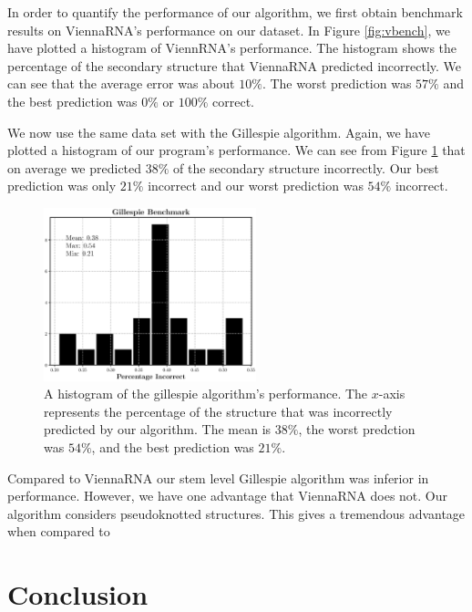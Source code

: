 \documentclass[11pt]{article}
\begin{document}
\begin{multicols}{2}
In order to quantify the performance of our algorithm, we first obtain benchmark results on ViennaRNA's performance on our dataset. In Figure \ref{fig:vbench}, we have plotted a histogram of ViennRNA's performance. The histogram shows the percentage of the secondary structure that ViennaRNA predicted incorrectly. We can see that the average error was about $10\%$. The worst prediction was $57\%$ and the best prediction was $0\%$ or $100\%$ correct.

We now use the same data set with the Gillespie algorithm. Again, we have plotted a histogram of our program's performance. We can see from Figure \ref{fig:gill} that on average we predicted $38\%$ of the secondary structure incorrectly. Our best prediction was only $21\%$ incorrect and our worst prediction was $54\%$ incorrect.

\begin{figure}[H]
\centering
\includegraphics[width = 0.55\textwidth]{fig/gill_bench}
\caption{A histogram of the gillespie algorithm's performance. The $x$-axis represents the percentage of the structure that was incorrectly predicted by our algorithm. The mean is $38 \%$, the worst predction  was $54\%$, and the best prediction was $21 \%$.}
\label{fig:gill}
\end{figure}

Compared to ViennaRNA our stem level Gillespie algorithm was inferior in performance. However, we have one advantage that ViennaRNA does not. Our algorithm considers pseudoknotted structures. This gives a tremendous advantage when compared to 
\end{multicols}


\section{Conclusion}

\newpage
\nocite{*}
\printbibliography
\end{document}
